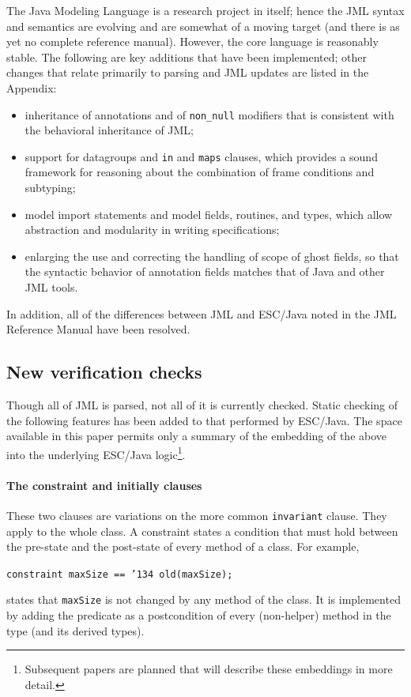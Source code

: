 \documentclass{llncs}
\begin{document}
The Java Modeling Language is a research project in itself; hence the
JML syntax and semantics are evolving and are somewhat of a moving
target (and there is as yet no complete reference manual).  However,
the core language is reasonably stable.  The following are key
additions that have been implemented; other changes that relate
primarily to parsing and JML updates are listed in the Appendix:

\setlength{\partopsep}{0in}\setlength{\parskip}{0in}\setlength{\itemsep}{0in}\setlength{\topsep}{0in}
\begin{itemize}
\setlength{\partopsep}{0in}\setlength{\parskip}{0in}\setlength{\itemsep}{0in}\setlength{\topsep}{0in}
\item inheritance of annotations and of \texttt{non\_null} modifiers
  that is consistent with the behavioral inheritance of JML;
\item support for datagroups and \texttt{in} and \texttt{maps}
  clauses, which provides a sound framework for reasoning about the
  combination of frame conditions and subtyping;
\item model import statements and model fields, routines, and types,
  which allow abstraction and modularity in writing specifications;
\item enlarging the use and correcting the handling of scope of ghost
  fields, so that the syntactic behavior of annotation fields matches
  that of Java and other JML tools.
\end{itemize}
In addition, all of the differences between JML and ESC/Java noted in
the JML Reference Manual have been resolved.

\subsection{New verification checks}
Though all of JML is parsed, not all of it is currently checked.
Static checking of the following features has been added to that
performed by ESC/Java.  The space available in this paper permits only
a summary of the embedding of the above into the underlying ESC/Java
logic\footnote{Subsequent papers are planned that will describe these
  embeddings in more detail.}.


\paragraph*{The constraint and initially clauses}
These two clauses are variations on the more common \texttt{invariant}
clause.  They apply to the whole class.  A constraint states a
condition that must hold between the pre-state and the post-state of
every method of a class.  For example,
\begin{center}
\texttt{constraint maxSize == \char'134 old(maxSize); }
\end{center}
states that \texttt{maxSize} is not changed by any method of the
class.  It is implemented by adding the predicate as a postcondition
of every (non-helper) method in the type (and its derived types).
\end{document}

